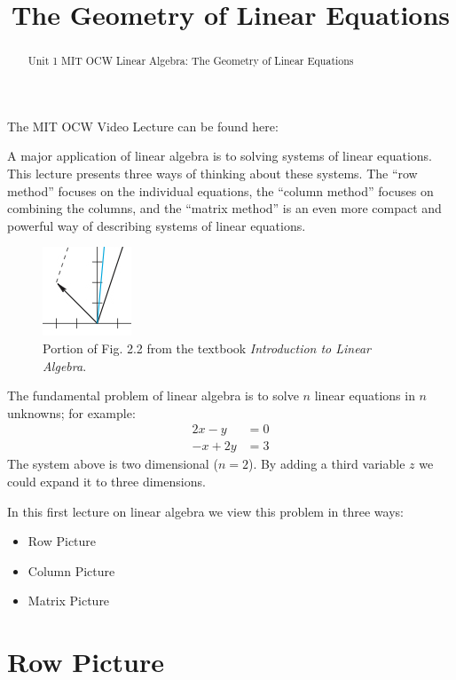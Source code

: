 \documentclass{ximera}
\title{The Geometry of Linear Equations}
\begin{document}
\begin{abstract}
  Unit 1 MIT OCW Linear Algebra: The Geometry of Linear Equations
\end{abstract}
\maketitle

The MIT OCW Video Lecture can be found
here:


A major application of linear algebra is to solving systems of linear
equations. This lecture presents three ways of thinking about these
systems. The ``row method'' focuses on the individual equations, the
``column method'' focuses on combining the columns, and the ``matrix
method'' is an even more compact and powerful way of describing
systems of linear equations.

\begin{figure}[H]
\begin{image}
\includegraphics{1_1.jpg}
\end{image}
\caption{Portion of Fig. 2.2 from the textbook \textit{Introduction to
    Linear Algebra}.}
\end{figure}

The fundamental problem of linear algebra is to solve $n$ linear
equations in $n$ unknowns; for example:
\begin{align*}
  2x-y &= 0 \\ 
  -x+2y &= 3
\end{align*}
The system above is two dimensional ($n = 2$). By adding a third
variable $z$ we could expand it to three dimensions.

In this first lecture on linear algebra we view this problem in three
ways:

\begin{itemize}
\item Row Picture
\item Column Picture
\item Matrix Picture
\end{itemize}

\section*{Row Picture}
\end{document}

